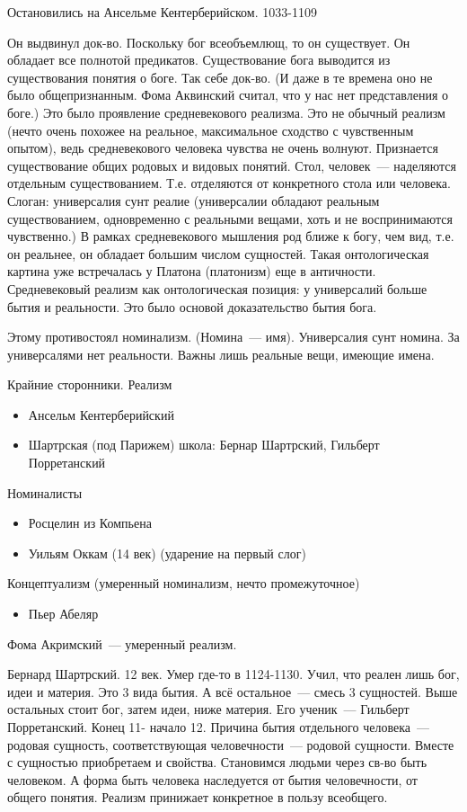 Остановились на Ансельме Кентерберийском. 1033-1109

Он выдвинул док-во. Поскольку бог всеобъемлющ, то он существует. Он обладает все полнотой предикатов. Существование бога выводится из существования понятия о боге. Так себе док-во. (И даже в те времена оно не было общепризнанным. Фома Аквинский считал, что у нас нет представления о боге.)
Это было проявление средневекового реализма. Это не обычный реализм (нечто очень похожее на реальное, максимальное сходство с чувственным опытом), ведь средневекового человека чувства не очень волнуют. Признается существование общих родовых и видовых понятий. Стол, человек~--- наделяются отдельным существованием. Т.е. отделяются от конкретного стола или человека. Слоган: универсалия сунт реалие (универсалии обладают реальным существованием, одновременно с реальными вещами, хоть и не воспринимаются чувственно.) В рамках средневекового мышления род ближе к богу, чем вид, т.е. он реальнее, он обладает большим числом сущностей. Такая онтологическая картина уже встречалась у Платона (платонизм) еще в античности. Средневековый реализм как онтологическая позиция: у универсалий больше бытия и реальности. Это было основой доказательство бытия бога.

Этому противостоял номинализм. (Номина~--- имя). Универсалия сунт номина. За универсалями нет реальности. Важны лишь реальные вещи, имеющие имена.

Крайние сторонники.
Реализм

\begin{itemize}
	\item Ансельм Кентерберийский
	\item Шартрская (под Парижем) школа: Бернар Шартрский, Гильберт Порретанский
\end{itemize}

Номиналисты
\begin{itemize}
	\item Росцелин из Компьена
	\item Уильям Оккам (14 век) (ударение на первый слог)
\end{itemize}

Концептуализм (умеренный номинализм, нечто промежуточное)
\begin{itemize}
	\item Пьер Абеляр
\end{itemize}
Фома Акримский~--- умеренный реализм.

Бернард Шартрский. 12 век. Умер где-то в 1124-1130. Учил, что реален лишь бог, идеи и материя. Это 3 вида бытия. А всё остальное~--- смесь 3 сущностей. Выше остальных стоит бог, затем идеи, ниже материя.
Его ученик~--- Гильберт Порретанский. Конец 11- начало 12. Причина бытия отдельного человека~--- родовая сущность, соответствующая человечности~--- родовой сущности. Вместе с сущностью приобретаем и свойства. Становимся людьми через св-во быть человеком. А форма быть человека наследуется от бытия человечности, от общего понятия. Реализм принижает конкретное в пользу всеобщего.

